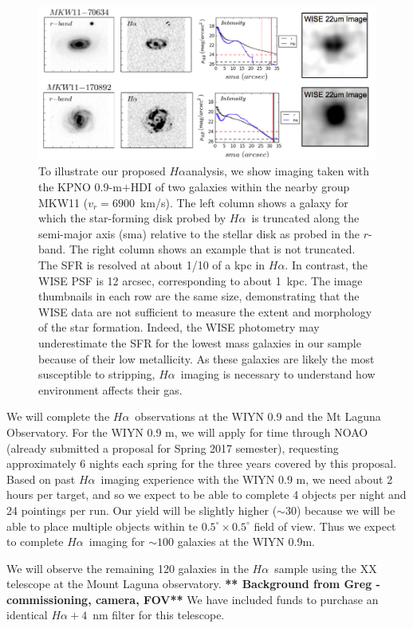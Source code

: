\documentclass[12pt, preprint]{aastex}
\newcommand{\ha}{$H\alpha$}
\begin{document}
\begin{figure}[h]
\centering
\includegraphics[width=.85\textwidth]{HalphaProfileWISE.png}
\caption{\small
To illustrate our proposed \ha  analysis, we show
imaging taken with the KPNO 0.9-m$+$HDI of two galaxies within the
nearby group  MKW11 ($v_r = 6900$~km/s). The left column shows a
galaxy for which the star-forming disk probed by \ha \ is truncated
along the semi-major axis (sma)  relative to the stellar disk as
probed in the $r$-band. The right column  shows an example that is not
truncated.  The SFR is resolved  at about 1/10 of a kpc in \ha. In
contrast, the WISE PSF is 12 arcsec, corresponding to about 1~kpc. The image thumbnails in each row are the same size, demonstrating
that the WISE data are not sufficient to measure the extent and
morphology of the star formation.   Indeed, the WISE photometry may
underestimate the SFR for  the lowest mass galaxies in our sample
because of their low metallicity.  As these galaxies are likely the
most susceptible to stripping, \ha\ imaging is necessary to understand
how environment affects their gas.}
\label{fig3}
\end{figure}


We will complete the \ha \ observations at the WIYN 0.9 and the Mt
Laguna Observatory.  For the WIYN 0.9 m, we will apply for time
through NOAO (already submitted a proposal for Spring 2017 semester), requesting
approximately 6 nights each spring for the three years covered by this
proposal.  Based on past \ha \ imaging experience with the WIYN 0.9 m,
we need about 2 hours per target, and so we expect to be able to
complete 4 objects per night and 24 pointings per run.  Our yield will
be slightly higher ($\sim 30$) because we will be able to place multiple objects within
te $0.5^\circ \times 0.5^\circ$ field of view.  Thus we expect to
complete \ha \ imaging for
$\sim 100$ galaxies at the WIYN 0.9m. 

We will observe the remaining 120 galaxies in the \ha \ sample using the
XX telescope at the Mount Laguna observatory.  
{\bf *** Background from Greg - commissioning, camera, FOV**}
We have included funds to purchase an identical 
$H\alpha+4$~nm filter for this telescope.  
\end{document}

